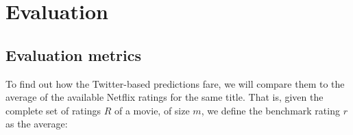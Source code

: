 
\chapter{Evaluation} %

\label{Chapter5}





\section{Evaluation metrics} %
\label{sec:evaluation_metrics}

To find out how the Twitter-based predictions fare, we will compare them to the average of the available Netflix ratings for the same title. That is, given the complete set of ratings $R$ of a movie, of size $m$, we define the benchmark rating $r$ as the average:

